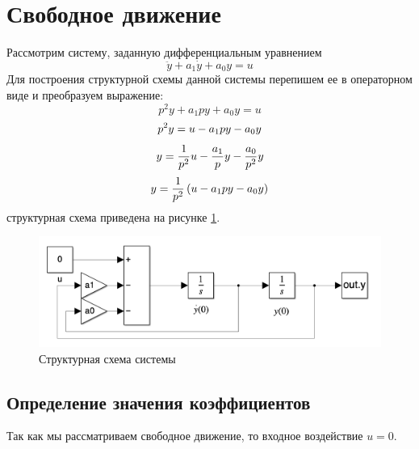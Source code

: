 \section{Свободное движение}
Рассмотрим систему, заданную дифференциальным уравнением
\begin{equation}
    \ddot{y} + a_1 \dot{y} + a_0 y = u
    \label{eq:system}
\end{equation}
Для построения структурной схемы данной системы перепишем ее в операторном виде и преобразуем выражение: 
\begin{equation}
    p^2 y + a_1 p y + a_0 y = u
\end{equation}
\begin{equation}
    p^2 y = u - a_1 p y - a_0 y
    \notag
\end{equation}
\begin{equation}
    y = \frac{1}{p^2} u - \frac{a_1}{p} y - \frac{a_0}{p^2} y
    \notag
\end{equation}
\begin{equation}
    y = \frac{1}{p^2} \left( u -a_1py - a_0y \right) 
    \notag
\end{equation}
структурная схема приведена на рисунке \ref{fig:scheme1}.
\begin{figure}[ht!]
    \centering
    \includegraphics[width=\textwidth]{media/scheme1.png}
    \caption{Структурная схема системы}
    \label{fig:scheme1}
\end{figure}

\subsection{Определение значения коэффициентов}
Так как мы рассматриваем свободное движение, то входное воздействие $u = 0$.

